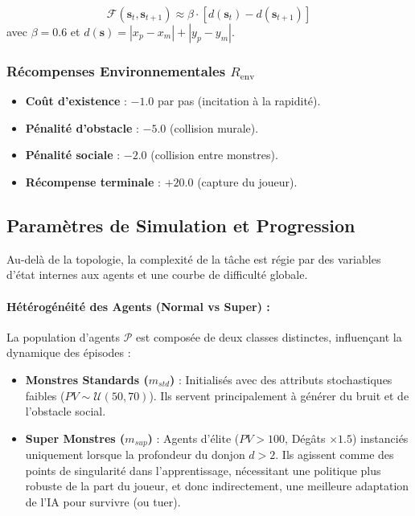 \documentclass[12pt,a4paper]{article}
\newcommand{\state}{\mathbf{s}}
\begin{document}
\begin{equation}
    \mathcal{F}(\state_t, \state_{t+1}) \approx \beta \cdot [ d(\state_t) - d(\state_{t+1}) ]
\end{equation}
avec $\beta = 0.6$ et $d(\state) = |x_p - x_m| + |y_p - y_m|$.

\subsubsection{Récompenses Environnementales $R_{\text{env}}$}
\begin{itemize}
    \item \textbf{Coût d'existence} : $-1.0$ par pas (incitation à la rapidité).
    \item \textbf{Pénalité d'obstacle} : $-5.0$ (collision murale).
    \item \textbf{Pénalité sociale} : $-2.0$ (collision entre monstres).
    \item \textbf{Récompense terminale} : $+20.0$ (capture du joueur).
\end{itemize}

\subsection{Paramètres de Simulation et Progression}
Au-delà de la topologie, la complexité de la tâche est régie par des variables d'état internes aux agents et une courbe de difficulté globale.

\paragraph{Hétérogénéité des Agents (Normal vs Super) :}
La population d'agents $\mathcal{P}$ est composée de deux classes distinctes, influençant la dynamique des épisodes :
\begin{itemize}
    \item \textbf{Monstres Standards ($m_{std}$)} : Initialisés avec des attributs stochastiques faibles ($PV \sim \mathcal{U}(50, 70)$). Ils servent principalement à générer du bruit et de l'obstacle social.
    \item \textbf{Super Monstres ($m_{sup}$)} : Agents d'élite ($PV > 100$, Dégâts $\times 1.5$) instanciés uniquement lorsque la profondeur du donjon $d > 2$. Ils agissent comme des points de singularité dans l'apprentissage, nécessitant une politique plus robuste de la part du joueur, et donc indirectement, une meilleure adaptation de l'IA pour survivre (ou tuer).
\end{itemize}
\end{document}
